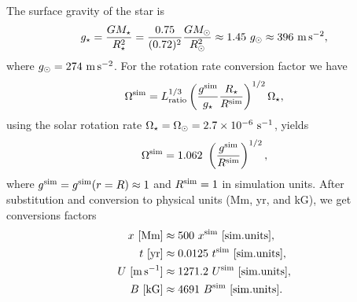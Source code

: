 \documentclass[baaa]{baaa}
\begin{document}
The surface gravity of the star is 
\begin{equation*}
    g_{\star}= \frac{GM_{\star}}{R_{\star}^2} = \frac{0.75}{(0.72)^2} \frac{G M_{\odot}}{R_{\odot}^{2}} \approx 1.45~ g_{\odot} \approx 396~ {\rm m\,s^{-2}},
\end{equation*}
where $g_{\odot} = 274~ \rm {m\,s^{-2}}$. For the rotation rate conversion factor we have
\begin{equation*}
    \Omega^{\rm sim} = L_{\rm ratio}^{1/3} \left(\frac{g^{\rm sim}}{g_{\star}} \frac{R_{\star}}{R^{\rm sim}}\right)^{1/2} \Omega_{\star},
\end{equation*}
using the solar rotation rate $\Omega_{\star} = \Omega_{\odot} = 2.7\times 10^{-6}~ \rm s^{-1}$, yields
\begin{equation*}
    \Omega^{\rm sim} = 1.062~ \left(\frac{g^{\rm sim}}{R^{\rm sim}}\right)^{1/2},
\end{equation*}
where $g^{\rm sim} = g^{\rm sim}(r=R)\approx 1$ and $R^{\rm sim}=1$ in simulation units. After substitution and conversion to physical units (Mm, yr, and kG), we get conversions factors
\begin{align}
    x~ [\rm Mm] &\approx 500~ x^{\rm sim}~ [\rm sim. units], \\
    t~ [\rm yr] &\approx 0.0125~ t^{\rm sim}~ [\rm sim. units], \\
    U~ [\rm m\,s^{-1}] &\approx 1271.2~U^{\rm sim}~ [\rm sim. units], \\
    B~ [\rm kG] &\approx 4691~ B^{\rm sim}~ [\rm sim.units].
\end{align}
\end{document}
